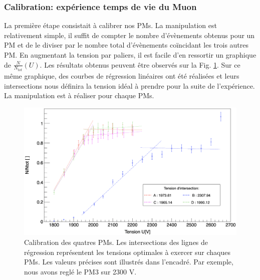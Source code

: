 \documentclass[12pt]{article}
\begin{document}
\subsubsection{Calibration: expérience temps de vie du Muon}

La première étape consistait à calibrer nos PMs. La manipulation est relativement simple, il suffit de compter le nombre d'évènements obtenus pour un PM et de le diviser par le nombre total d'évènements coïncidant les trois autres PM. En augmentant la tension par paliers, il est facile d'en ressortir un graphique de $\frac{N}{N_{tot}}(U)$. Les résultats obtenus peuvent être observés sur la Fig. \ref{fig:Graph_calib_exp_1}. Sur ce même graphique, des courbes de régression linéaires ont été réalisées et leurs intersections nous définira la tension idéal à prendre pour la suite de l'expérience. La manipulation est à réaliser pour chaque PMs.

\begin{figure}[htpb!]
    \centering
    \includegraphics[width=\textwidth]{graphiques/experience1/calibration/calibration_exp1.png}
    \caption{Calibration des quatres PMs. Les intersections des lignes de régression représentent les tensions optimales à exercer sur chaques PMs. Les valeurs précises sont illustrés dans l'encadré. Par exemple, nous avons reglé le PM3 sur 2300 V.}
    \label{fig:Graph_calib_exp_1}
\end{figure}

\newpage
\end{document}
